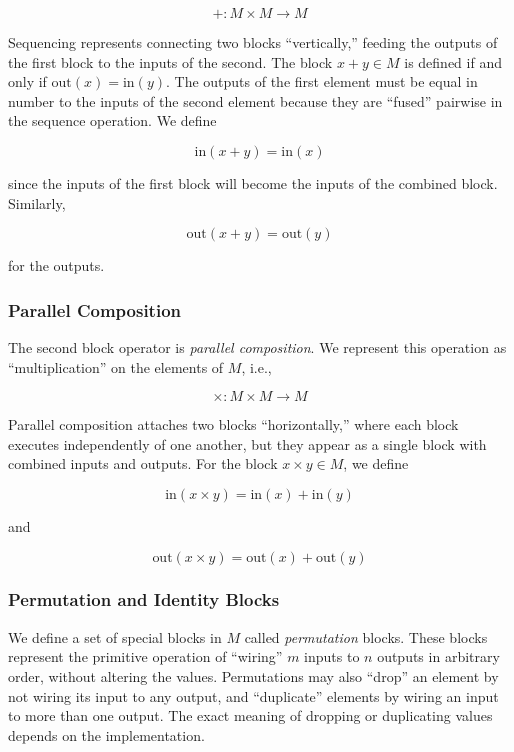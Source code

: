 \[
+ : M \times M \to M
\]

Sequencing represents connecting two blocks ``vertically,''
feeding the outputs of the first block to the inputs of the
second. The block $x+y \in M$ is defined if and only if
$\mbox{out}(x) = \mbox{in}(y)$. The outputs of the first element
must be equal in number to the inputs of the second element
because they are ``fused'' pairwise in the sequence operation. We
define

\[
\mbox{in}(x+y) = \mbox{in}(x)
\]

since the inputs of the first block will become the inputs of the
combined block. Similarly,

\[
\mbox{out}(x+y) = \mbox{out}(y)
\]

for the outputs.

\subsubsection{Parallel Composition}
\label{sec:code-gen:par}

The second block operator is \emph{parallel composition}. We
represent this operation as ``multiplication'' on the elements of
$M$, i.e.,

\[
\times : M \times M \to M
\]

Parallel composition attaches two blocks ``horizontally,'' where
each block executes independently of one another, but they appear
as a single block with combined inputs and outputs. For the block
$x\times y \in M$, we define

\[
\mbox{in} (x \times y) = \mbox{in}(x)+\mbox{in}(y)
\]

and

\[
\mbox{out}(x \times y) = \mbox{out}(x) + \mbox{out}(y)
\]

\subsubsection{Permutation and Identity Blocks}
\label{sec:code-gen:special}

We define a set of special blocks in $M$ called \emph{permutation}
blocks. These blocks represent the primitive operation of
``wiring'' $m$ inputs to $n$ outputs in arbitrary order, without
altering the values. Permutations may also ``drop'' an element by
not wiring its input to any output, and ``duplicate'' elements by
wiring an input to more than one output. The exact meaning of
dropping or duplicating values depends on the implementation.

